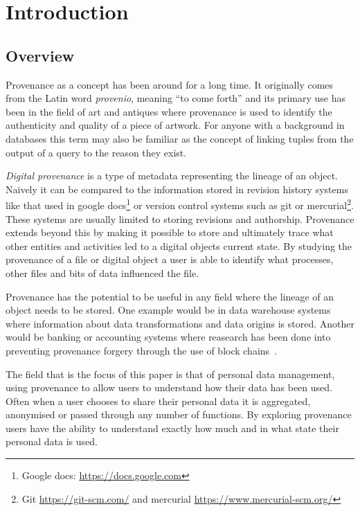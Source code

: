 \chapter{Introduction}

\section{Overview}

Provenance as a concept has been around for a long time. It originally comes from the Latin word \textit{provenio}, meaning ``to come forth'' and its primary use has been in the field of art and antiques where provenance is used to identify the authenticity and quality of a piece of artwork. For anyone with a background in databases this term may also be familiar as the concept of linking tuples from the output of a query to the reason they exist.

\textit{Digital provenance} is a type of metadata representing the lineage of an object. Naively it can be compared to the information stored in revision history systems like that used in google docs\footnote{Google docs: \url{https://docs.google.com}} or version control
systems such as git or mercurial\footnote{Git \url{https://git-scm.com/} and mercurial \url{https://www.mercurial-scm.org/}}. These systems are usually limited to storing revisions and authorship. Provenance extends beyond this by making it possible to store and ultimately trace what other entities and activities led to a digital objects current state. By studying the provenance of a file or digital object a user is able to identify what processes, other files and bits of data influenced the file.

Provenance has the potential to be useful in any field where the lineage of an object needs to be stored. One example would be in data warehouse systems where information about data transformations and data origins is stored. Another would be banking or accounting systems where reasearch has been done into preventing provenance forgery through the use of block chains~\cite{Hasan2009}.

The field that is the focus of this paper is that of personal data management, using provenance to  allow users to understand how their data has been used. Often when a user chooses to share their personal data it is aggregated, anonymised or passed through any number of functions. By exploring provenance users have the ability to understand exactly how much and in what state their personal data is used.

